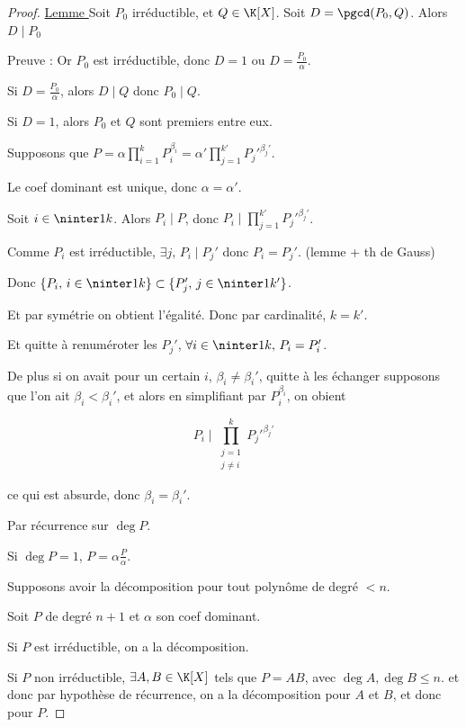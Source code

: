 
\begin{proof}
    \uline{Lemme } Soit $P_0$ irréductible, et $Q \in \K[X]$. Soit $D = \pgcd(P_0, Q)$.
    Alors $D \mid P_0$

    \avspace Preuve : Or $P_0$ est irréductible, donc $D = 1$ ou $D = \frac {P_0} \alpha$.

    Si $D = \frac {P_0} \alpha$, alors $D \mid Q$ donc $P_0 \mid Q$.

    Si $D = 1$, alors $P_0$ et $Q$ sont premiers entre eux.

    \lvspace {}

    Supposons que $\displaystyle P = \alpha \prod_{i = 1}^k P_i^{\beta_i} = \alpha' \prod_{j = 1}^{k'} P_j'^{\beta_j'}$.

    Le coef dominant est unique, donc $\alpha = \alpha'$.

    Soit $i \in \ninter 1 k$. Alors $P_i \mid P$, donc $\displaystyle P_i \mid \prod_{j = 1}^{k'} P_j'^{\beta_j'}$.

    Comme $P_i$ est irréductible, $\exists j, \, P_i \mid P_j'$ donc $P_i = P_j'$. (lemme + th de Gauss)

    Donc $\{P_i, \, i \in \ninter 1 k \} \subset \{P_j', \, j \in \ninter 1 {k'}\}$.

    Et par symétrie on obtient l'égalité. Donc par cardinalité, $k = k'$.

    Et quitte à renuméroter les $P_j'$, $\forall i \in \ninter 1 k, \, P_i = P_i'$.

    De plus si on avait pour un certain $i$, $\beta_i \neq \beta_i'$, quitte à les échanger supposons 
    que l'on ait $\beta_i < \beta_i'$, et alors en simplifiant par $P_i^{\beta_i}$, on obient
    
    $$P_i \mid \prod_{\substack{j = 1 \\ j \neq i}}^k P_j'^{\beta_j'}$$

    ce qui est absurde, donc $\beta_i = \beta_i'$.


    Par récurrence sur $\deg P$. 

    Si $\deg P = 1$, $P = \alpha \frac P \alpha$. 

    Supposons avoir la décomposition pour tout polynôme de degré $< n$. 

    Soit $P$ de degré $n + 1$ et $\alpha$ son coef dominant.

    Si $P$ est irréductible, on a la décomposition.

    Si $P$ non irréductible, $\exists A, B \in \K[X]$ tels que $P = AB$, avec $\deg A, \deg B \leqslant n$.
    et donc par hypothèse de récurrence, on a la décomposition pour $A$ et $B$, et donc pour $P$.
\end{proof}

